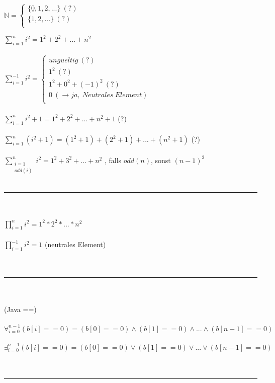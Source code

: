 \documentclass[18pt,a4paper]{article}
\newcommand{\ra}{\rightarrow}
\begin{document}
$\mathbb{N} = \begin{cases} 
		 \{\underline{0},1,2,...\} \:(?)\\
		 \{1,2,...\} \:(?)\\ 
		 \end{cases}$ 


$\sum_{i=1}^{n}i^2 = 1^2 + 2^2 + ... + n^2 $\\
\\
$\sum_{i=1}^{-1}i^2 = \begin{cases}
                       ungueltig \:(?)\\
                       1^2 \:(?)\\
                       1^2 + 0^2 + (-1)^2 \:(?)\\
                       0 \:(\ra ja, \:Neutrales \:Element)\\
                      \end{cases}$\\                           
\\
$\sum_{i=1}^{n}i^2 + 1 = 1^2 + 2^2 + ... + n^2 + 1 $ (?)\\
\\
$\sum_{i=1}^{n}(i^2 + 1) = (1^2 + 1) + (2^2 + 1) + ... + (n^2 + 1) $ (?)\\
\\
$\sum_{\substack{i=1\\odd(i)}}^{n}i^2 = 1^2 + 3^2 + ... + n^2 $ , falls $odd(n)$, sonst $(n-1)^2$\\ 
\\
\rule{\textwidth}{0.4mm}\\
\\
$\prod_{i=1}^{n}i^2 = 1^2 * 2^2 * ... * n^2 $\\
\\
$\prod_{i=1}^{-1}i^2 = 1 $ (neutrales Element)\\
\\
\\
\rule{\textwidth}{0.4mm}\\
\\
(Java ==)\\
\\
$\forall_{i=0}^{n-1} (b[i] == 0) = (b[0]==0) \wedge (b[1]==0) \wedge ... \wedge (b[n-1]==0) $\\
\\
$\exists_{i=0}^{n-1} (b[i] == 0) = (b[0]==0) \vee (b[1]==0) \vee ... \vee (b[n-1]==0) $\\
\\
\\
\rule{\textwidth}{0.4mm}\\
\end{document}
